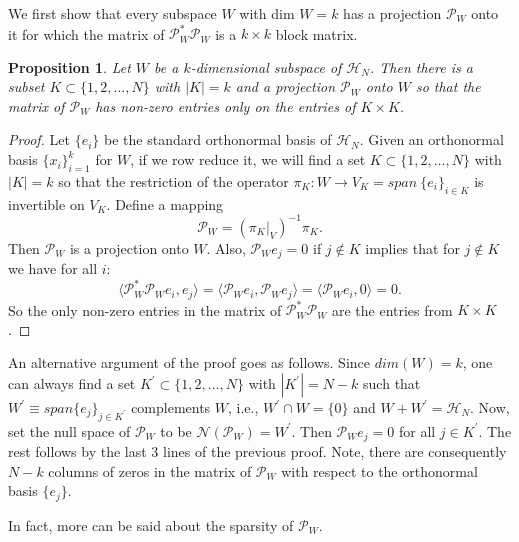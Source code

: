 \documentclass[11pt,reqno]{amsart}
\newtheorem{proposition}[thm]{Proposition}
\theoremstyle{remark}
\begin{document}
We first show that every subspace $W$ with dim $W=k$
has a projection ${\mathcal P}_W$ onto it for which the
matrix of ${\mathcal P}_W^*{\mathcal P}_W$ is a $k\times k$ block matrix.

\begin{proposition} \label{prop_kxk}
Let $W$ be a $k$-dimensional subspace of ${\mathcal H}_N$.  Then there is a
subset $K\subset \{1,2,\ldots,N\}$ with $|K|=k$ and a projection ${\mathcal P}_W$
onto $W$ so that the matrix of ${\mathcal P}_W$ has non-zero entries only
on the entries of $K\times K$.
\end{proposition}

\begin{proof}
Let $\{e_i\}$ be the standard orthonormal basis of ${\mathcal H}_N$.
Given an orthonormal basis $\{x_i\}_{i=1}^k$ for $W$, if we row reduce it, we
will find a set $K\subset \{1,2,\ldots,N\}$ with $|K|=k$ so that the restriction of the operator
$\pi_K:W\rightarrow V_K = span\ \{e_i\}_{i\in K}$ is invertible on $V_K$.  Define a mapping
\[
{\mathcal P}_W = \left ( \pi_K|_{V}\right )^{-1}\pi_K.
\]
Then ${\mathcal P}_W$ is a projection onto $W$.  Also, ${\mathcal P}_We_j = 0$ if $j\notin K$
implies that for $j\notin K$ we have for all $i$:
\[
\langle {\mathcal P}_W^*{\mathcal P}_W e_i,e_j\rangle = \langle {\mathcal P}_We_i,{\mathcal P}_We_j\rangle
= \langle {\mathcal P}_We_i,0\rangle =0.
\]
So the only non-zero entries in the matrix of ${\mathcal P}_W^*{\mathcal P}_W$ are the entries
from $K\times K$.
\end{proof}

An alternative argument of the proof goes as follows.   Since $dim(W)=k$, one can always find a set $K^{'}\subset \{1, 2, \ldots,N\}$ with $|K^{'}|=N-k$ such that $W^{'}\equiv span\{e_j\}_{j\in K^{'}}$ complements $W$, i.e., $W^{'}\cap W =\{0\}$ and $W+W^{'}={\mathcal H}_N$.   Now, set the null space of ${{\mathcal P}}_W$ to be ${{\mathcal N}}({{\mathcal P}}_W)=W^{'}$.  Then ${{\mathcal P}}_W e_j =0$ for all $j\in K^{'}$.   The rest follows by the last 3 lines of the previous proof.   Note, there are consequently $N-k$ columns of zeros in the matrix of ${{\mathcal P}}_W$ with respect to the orthonormal basis $\{e_j\}$.

\smallskip
\smallskip
\smallskip

In fact, more can be said about the sparsity of ${{\mathcal P}}_W$.
\end{document}
